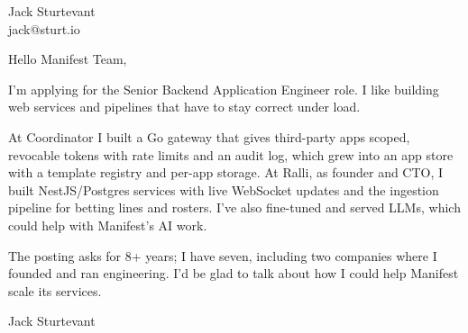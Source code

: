 \documentclass[11pt]{article}
\begin{document}
\raggedright

{\namefont\fontsize{20pt}{24pt}\selectfont Jack Sturtevant}\\[-0.3em]
jack@sturt.io

\vspace{1.2em}

Hello Manifest Team,

I'm applying for the Senior Backend Application Engineer role. I like building web services and pipelines that have to stay correct under load.

At Coordinator I built a Go gateway that gives third-party apps scoped, revocable tokens with rate limits and an audit log, which grew into an app store with a template registry and per-app storage. At Ralli, as founder and CTO, I built NestJS/Postgres services with live WebSocket updates and the ingestion pipeline for betting lines and rosters. I've also fine-tuned and served LLMs, which could help with Manifest's AI work.

The posting asks for 8+ years; I have seven, including two companies where I founded and ran engineering. I'd be glad to talk about how I could help Manifest scale its services.

\vspace{0.6em}
Jack Sturtevant
\end{document}
